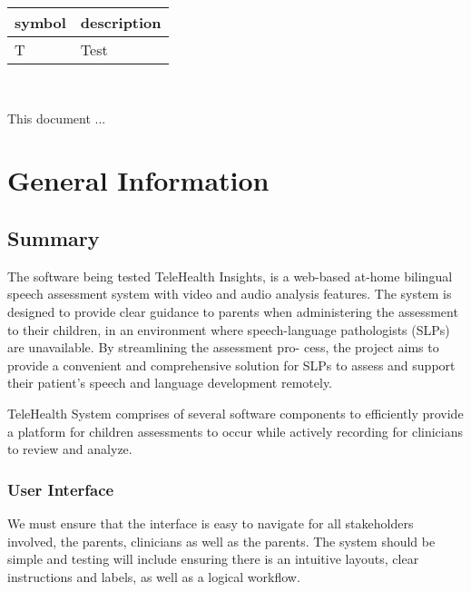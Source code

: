 \documentclass[12pt, titlepage]{article}
\begin{document}
\renewcommand{\arraystretch}{1.2}
\begin{tabular}{l l} 
  \toprule		
  \textbf{symbol} & \textbf{description}\\
  \midrule 
  T & Test\\
  \bottomrule
\end{tabular}\\



\newpage


This document ... 

\section{General Information}

\subsection{Summary}


  The software being tested TeleHealth Insights, is a web-based at-home bilingual
  speech assessment system with video and audio analysis features. The system is designed to provide clear 
  guidance to parents when administering the assessment to their children, in an environment where speech-language
  pathologists (SLPs) are unavailable. By streamlining the assessment pro-
  cess, the project aims to provide a convenient and comprehensive solution
  for SLPs to assess and support their patient's speech and language development remotely.

  TeleHealth System comprises of several software components to efficiently provide 
  a platform for children assessments to occur while actively recording for clinicians to review and analyze. 

  \subsubsection{User Interface}

  We must ensure that the interface is easy to navigate for all stakeholders involved, the parents, 
  clinicians as well as the parents. The system should be simple and testing will include ensuring 
  there is an intuitive layouts, clear instructions and labels, as well as a logical workflow.
\end{document}

